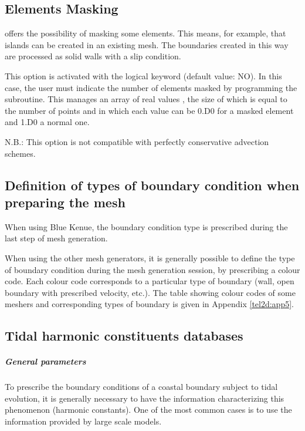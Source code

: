 \subsection{Elements Masking}

 offers the possibility of masking some elements.
This means, for example, that islands can be created in an existing mesh.
The boundaries created in this way are processed as solid walls with a slip
condition.

This option is activated with the logical keyword
 (default value: NO).
In this case, the user must indicate the number of elements masked
by programming the  subroutine.
This manages an array of real values , the size of which
is equal to the number of points and in which each value can be 0.D0
for a masked element and 1.D0 a normal one.

N.B.: This option is not compatible with perfectly conservative advection schemes.


\subsection{Definition of types of boundary condition when preparing the mesh}

When using Blue Kenue, the boundary condition type is prescribed during the last
step of mesh generation.

When using the other mesh generators, it is generally possible to define
the type of boundary condition during the mesh generation session, by prescribing
a colour code.
Each colour code corresponds to a particular type of boundary
(wall, open boundary with prescribed velocity, etc.).
The table showing colour codes of some meshers and corresponding types of
boundary is given in Appendix \ref{tel2d:app5}.


\subsection{Tidal harmonic constituents databases}
\label{subs:tidal:harm:datab}

\subparagraph{General parameters}

To prescribe the boundary conditions of a coastal boundary subject to tidal
evolution, it is generally necessary to have the information characterizing
this phenomenon (harmonic constants).
One of the most common cases is to use the information provided by large scale
models.


